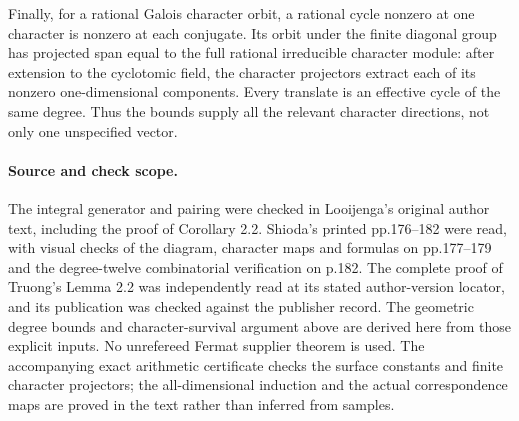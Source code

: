 Finally, for a rational Galois character orbit, a rational
cycle nonzero at one character is nonzero at each conjugate.
Its orbit under the finite diagonal group has projected span
equal to the full rational irreducible character module:
after extension to the cyclotomic field, the character
projectors extract each of its nonzero one-dimensional
components.  Every translate is an effective cycle of the
same degree.  Thus the bounds supply all the relevant
character directions, not only one unspecified vector.

\paragraph{Source and check scope.}
The integral generator and pairing were checked in Looijenga's
original author text, including the proof of Corollary 2.2.
Shioda's printed pp.176--182 were read, with visual checks of
the diagram, character maps and formulas on pp.177--179 and
the degree-twelve combinatorial verification on p.182.
The complete proof of Truong's Lemma 2.2 was independently
read at its stated author-version locator, and its publication
was checked against the publisher record.
The geometric degree bounds and character-survival argument
above are derived here from those explicit inputs.  No
unrefereed Fermat supplier theorem is used.
The accompanying exact arithmetic certificate checks the
surface constants and finite character projectors; the
all-dimensional induction and the actual correspondence
maps are proved in the text rather than inferred from samples.

